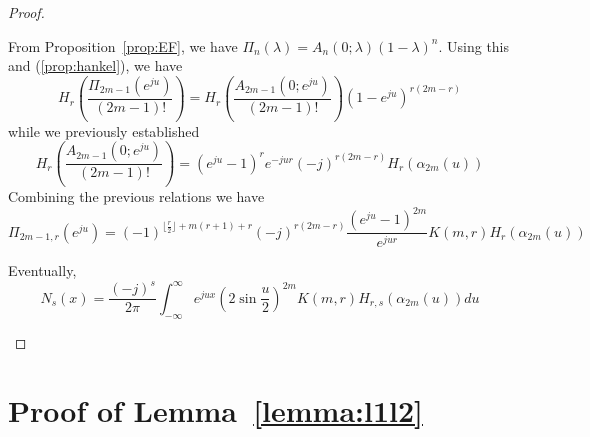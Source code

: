 \begin{proof}
\begin{enumerate}
    From Proposition~\ref{prop:EF}, we have $\Pi_{n}(\lambda) = A_n(0;\lambda){(1-\lambda)}^n$.  Using this and 
    (\ref{prop:hankel}), we have
    \begin{equation*}
      H_r\left(\frac{\Pi_{2m-1}(e^{ju})}{(2m-1)!}\right) = H_r\left(\frac{A_{2m-1}(0;e^{ju})}{(2m-1)!}\right) 
      {(1-e^{ju})}^{r(2m-r)}
    \end{equation*}
    while we previously established
    \begin{equation*}
      H_r\left(\frac{A_{2m-1}(0;e^{ju})}{(2m-1)!}\right) = {(e^{ju}-1)}^{r}e^{-jur} {(-j)}^{r(2m-r)} 
      H_r(\alpha_{2m} (u))
    \end{equation*}
    Combining the previous relations we have
    \begin{equation}\label{eq:relHrPi}
      \Pi_{2m-1,r}(e^{ju}) = {(-1)}^{\lfloor \frac{r}{2} \rfloor + m(r+1) + r} {(-j)}^{r(2m-r)} 
      \frac{{\left(e^{ju}-1\right)}^{2m}}{e^{jur}} K(m,r) H_r(\alpha_{2m}(u))
    \end{equation}

    Eventually,
    \begin{equation}
      N_s(x) = \frac{{(-j)}^{s}}{2\pi} \int_{-\infty}^{\infty} e^{jux} {\left(2\sin \frac{u}{2}\right)}^{2m} K(m,r)   
      H_{r,s}(\alpha_{2m}(u)) du
    \end{equation}
  \end{enumerate}
\end{proof}

\section{Proof of Lemma~\ref{lemma:l1l2}}\label{proof:lemmal1l2}

